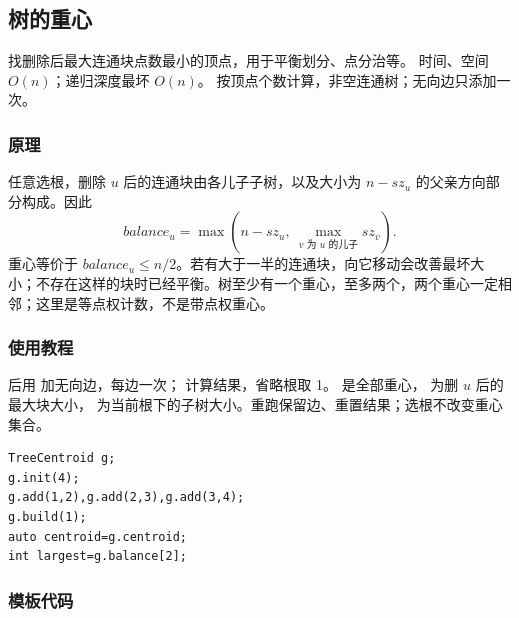 \subsection{树的重心}
\label{tree:centroid}
\AlgorithmInfo
    {找删除后最大连通块点数最小的顶点，用于平衡划分、点分治等。}
    {时间、空间 $O(n)$；递归深度最坏 $O(n)$。}
    {按顶点个数计算，非空连通树；无向边只添加一次。}
\subsubsection*{原理}
任意选根，删除 $u$ 后的连通块由各儿子子树，以及大小为 $n-sz_u$ 的父亲方向部分构成。因此
\[
    balance_u=\max\left(n-sz_u,\ \max_{v\text{ 为 }u\text{ 的儿子}}sz_v\right).
\]
重心等价于 $balance_u\le n/2$。若有大于一半的连通块，向它移动会改善最坏大小；不存在这样的块时已经平衡。树至少有一个重心，至多两个，两个重心一定相邻；这里是等点权计数，不是带点权重心。
\subsubsection*{使用教程}
 后用  加无向边，每边一次； 计算结果，省略根取 1。 是全部重心， 为删 $u$ 后的最大块大小， 为当前根下的子树大小。重跑保留边、重置结果；选根不改变重心集合。
\begin{lstlisting}[style=mtycpp,numbers=none]
TreeCentroid g;
g.init(4);
g.add(1,2),g.add(2,3),g.add(3,4);
g.build(1);
auto centroid=g.centroid;
int largest=g.balance[2];
\end{lstlisting}
\subsubsection*{模板代码}
